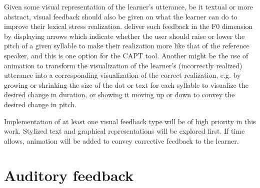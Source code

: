 	Given some visual representation of the learner's utterance, be it textual or more abstract, visual feedback should also be given on what the learner can do to improve their lexical stress realization. \textcite{Bonneau2011} deliver such feedback in the F0 dimension by displaying arrows which indicate whether the user should raise or lower the pitch of a given syllable to make their realization more like that of the reference speaker, and this is one option for the CAPT tool. Another might be the use of animation to transform the visualization of the learner's (incorrectly realized) utterance into a corresponding visualization of the correct realization, e.g. by growing or shrinking the size of the dot or text for each syllable to visualize the desired change in duration, or showing it moving up or down to convey the desired change in pitch.
	
	

	Implementation of at least one visual feedback type will be of high priority in this work. Stylized text and graphical representations will be explored first. If time allows, animation will be added to convey corrective feedback to the learner.
	
	
\section{Auditory feedback}
\label{sec:fb:auditory}


